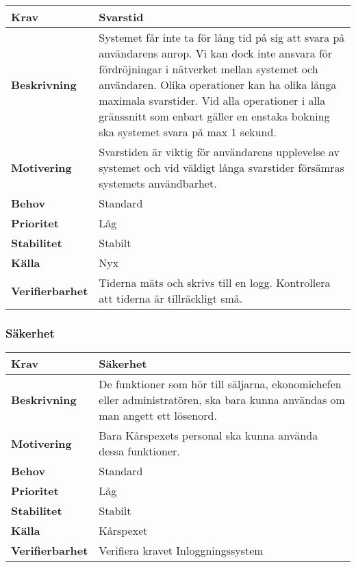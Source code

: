 \documentclass[a4paper, twoside, 11pt, titlepage]{article}
\begin{document}
		\begin{tabular} { p{2.6cm} p{12.5cm} }
			\hline
			\sffamily\textbf{Krav} & Svarstid  \\
			\hline
			\sffamily\textbf{Beskrivning} & Systemet får inte ta för lång tid på sig att svara på användarens anrop. Vi kan dock inte ansvara för fördröjningar i nätverket mellan systemet och användaren. Olika operationer kan ha olika långa maximala svarstider. Vid alla operationer i alla gränssnitt som enbart gäller en enstaka bokning ska systemet svara på max 1 sekund.  \\
			\hline
			\sffamily\textbf{Motivering} & Svarstiden är viktig för användarens upplevelse av systemet och vid väldigt långa svarstider försämras systemets användbarhet.  \\
			\hline
			\sffamily\textbf{Behov} & Standard  \\
			\hline
			\sffamily\textbf{Prioritet} & Låg  \\
			\hline
			\sffamily\textbf{Stabilitet} & Stabilt  \\
			\hline
			\sffamily\textbf{Källa} & Nyx  \\
			\hline
			\sffamily\textbf{Verifierbarhet} & Tiderna mäts och skrivs till en logg. Kontrollera att tiderna är tillräckligt små.  \\
			\hline
		\end{tabular}


		\subsubsection{Säkerhet}


		\begin{tabular} { p{2.6cm} p{12.5cm} }
			\hline
			\sffamily\textbf{Krav} & Säkerhet  \\
			\hline
			\sffamily\textbf{Beskrivning} & De funktioner som hör till säljarna, ekonomichefen eller administratören, ska bara kunna användas om man angett ett lösenord.  \\
			\hline
			\sffamily\textbf{Motivering} & Bara Kårspexets personal ska kunna använda dessa funktioner.  \\
			\hline
			\sffamily\textbf{Behov} & Standard  \\
			\hline
			\sffamily\textbf{Prioritet} & Låg  \\
			\hline
			\sffamily\textbf{Stabilitet} & Stabilt  \\
			\hline
			\sffamily\textbf{Källa} & Kårspexet  \\
			\hline
			\sffamily\textbf{Verifierbarhet} & Verifiera kravet Inloggningssystem  \\
			\hline
		\end{tabular}
\end{document}
